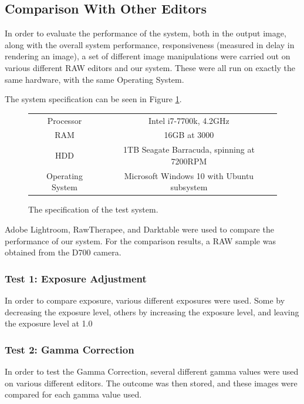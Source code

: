 \documentclass[11pt,a4paper]{article}
\begin{document}

\subsection{Comparison With Other Editors}
In order to evaluate the performance of the system, both in the output image, along with the overall system performance,
responsiveness (measured in delay in rendering an image), a set of different image manipulations were carried out on various
different RAW editors and our system. These were all run on exactly the same hardware, with the same Operating System.

The system specification can be seen in Figure \ref{SystemSpecs}.

\begin{figure}\label{SystemSpecs}
    \centering
    \begin{tabular}{| c | c |}
        \hline
        Processor & Intel i7-7700k, 4.2GHz\\
        RAM & 16GB at 3000\\
        HDD & 1TB Seagate Barracuda, spinning at 7200RPM\\
        Operating System & Microsoft Windows 10 with Ubuntu subsystem\\
        \hline
    \end{tabular}
    \caption{The specification of the test system.}
\end{figure}

Adobe Lightroom, RawTherapee, and Darktable were used to compare the performance of our system. For the comparison results,
a RAW sample was obtained from the D700 camera.

\subsubsection{Test 1: Exposure Adjustment}
In order to compare exposure, various different exposures were used. Some by decreasing the exposure level, others by
increasing the exposure level, and leaving the exposure level at 1.0

\subsubsection{Test 2: Gamma Correction}
In order to test the Gamma Correction, several different gamma values were used on various different editors.
The outcome was then stored, and these images were compared for each gamma value used.
\end{document}
